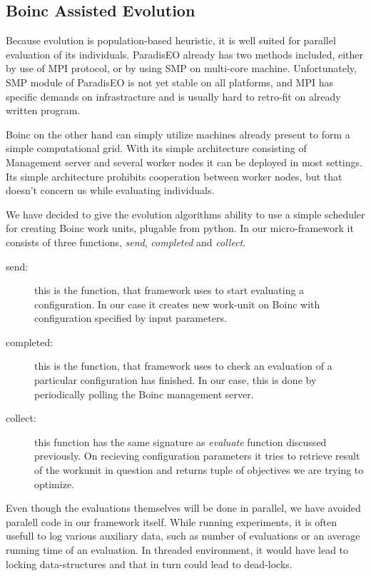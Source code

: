 \documentclass[12pt,oneside]{fithesis2}
\begin{document}
\subsection{Boinc Assisted Evolution}
Because evolution is population-based heuristic, it is well suited for parallel evaluation of its individuals. ParadisEO already has two methods included, either by use of MPI protocol, or by using SMP on multi-core machine\cite{liefooghe2007Paradiseo}. Unfortunately, SMP module of ParadisEO is not yet stable on all platforms, and MPI has specific demands on infrastracture and is usually hard to retro-fit on already written program. 


Boinc on the other hand  can simply utilize machines already present to form a simple computational grid. With its simple architecture consisting of Management server and several worker nodes it can be deployed in most settings. Its simple architecture prohibits cooperation between worker nodes, but that doesn't concern us while evaluating individuals.

We have decided to give the evolution algorithms ability to use a simple scheduler for creating Boinc work units, plugable from python. In our micro-framework it consists of three functions, \emph{send}, \emph{completed} and \emph{collect}.

\begin{description}
\item[send:] this is the function, that framework uses to start evaluating a configuration. In our case it creates new work-unit on Boinc with configuration specified by input parameters.
\item[completed:] this is the function, that framework uses to check an evaluation of a particular configuration has finished. In our case, this is done by periodically polling the Boinc management server.
\item[collect:] this function has the same signature as \emph{evaluate} function discussed previously. On recieving configuration parameters it tries to retrieve result of the workunit in question and returns tuple of objectives we are trying to optimize.
\end{description}

Even though the evaluations themselves will be done in parallel, we have avoided paralell code in our framework itself. While running experiments, it is often usefull to log various auxiliary data, such as number of evaluations or an average running time of an evaluation. In threaded environment, it would have lead to locking data-structures and that in turn could lead to dead-locks.
\end{document}
